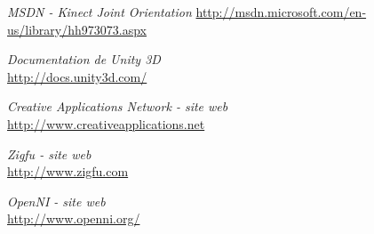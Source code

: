 \begin{thebibliography}{9}
  \emph{MSDN - Kinect Joint Orientation}
  \url{http://msdn.microsoft.com/en-us/library/hh973073.aspx}
  
  \emph{Documentation de Unity 3D}\\
  \url{http://docs.unity3d.com/}

  \emph{Creative Applications Network - site web}\\
  \url{http://www.creativeapplications.net}
  
  \emph{Zigfu - site web}\\
  \url{http://www.zigfu.com}

  \emph{OpenNI - site web}\\
  \url{http://www.openni.org/}
  
\end{thebibliography}
        
